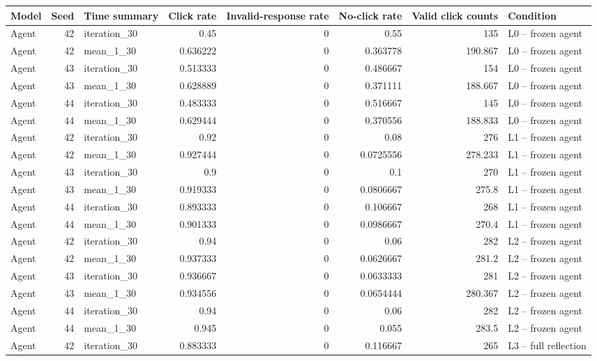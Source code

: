 \begin{table}[htbp!]
\centering
\small
\setlength{\tabcolsep}{3pt}
\renewcommand{\arraystretch}{1.1}
\begin{tabular}{lrlrrrrl}
\hline
Model & Seed & Time summary & Click rate & Invalid-response rate & No-click rate & Valid click counts & Condition \\
\hline
Agent & 42 & iteration\_30 & 0.45 & 0 & 0.55 & 135 & L0 -- frozen agent \\
Agent & 42 & mean\_1\_30 & 0.636222 & 0 & 0.363778 & 190.867 & L0 -- frozen agent \\
Agent & 43 & iteration\_30 & 0.513333 & 0 & 0.486667 & 154 & L0 -- frozen agent \\
Agent & 43 & mean\_1\_30 & 0.628889 & 0 & 0.371111 & 188.667 & L0 -- frozen agent \\
Agent & 44 & iteration\_30 & 0.483333 & 0 & 0.516667 & 145 & L0 -- frozen agent \\
Agent & 44 & mean\_1\_30 & 0.629444 & 0 & 0.370556 & 188.833 & L0 -- frozen agent \\
Agent & 42 & iteration\_30 & 0.92 & 0 & 0.08 & 276 & L1 -- frozen agent \\
Agent & 42 & mean\_1\_30 & 0.927444 & 0 & 0.0725556 & 278.233 & L1 -- frozen agent \\
Agent & 43 & iteration\_30 & 0.9 & 0 & 0.1 & 270 & L1 -- frozen agent \\
Agent & 43 & mean\_1\_30 & 0.919333 & 0 & 0.0806667 & 275.8 & L1 -- frozen agent \\
Agent & 44 & iteration\_30 & 0.893333 & 0 & 0.106667 & 268 & L1 -- frozen agent \\
Agent & 44 & mean\_1\_30 & 0.901333 & 0 & 0.0986667 & 270.4 & L1 -- frozen agent \\
Agent & 42 & iteration\_30 & 0.94 & 0 & 0.06 & 282 & L2 -- frozen agent \\
Agent & 42 & mean\_1\_30 & 0.937333 & 0 & 0.0626667 & 281.2 & L2 -- frozen agent \\
Agent & 43 & iteration\_30 & 0.936667 & 0 & 0.0633333 & 281 & L2 -- frozen agent \\
Agent & 43 & mean\_1\_30 & 0.934556 & 0 & 0.0654444 & 280.367 & L2 -- frozen agent \\
Agent & 44 & iteration\_30 & 0.94 & 0 & 0.06 & 282 & L2 -- frozen agent \\
Agent & 44 & mean\_1\_30 & 0.945 & 0 & 0.055 & 283.5 & L2 -- frozen agent \\
Agent & 42 & iteration\_30 & 0.883333 & 0 & 0.116667 & 265 & L3 -- full reflection \\

\end{tabular}
\end{table}
